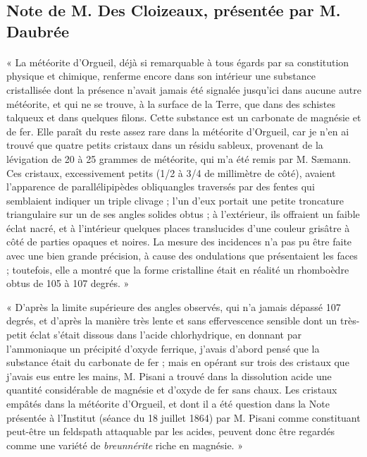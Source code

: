 \documentclass[a4paper, 11pt, oneside, polutonikogreek, french]{article}
\begin{document}
\subsection*{Note de M. Des Cloizeaux, présentée par M. Daubrée}
\paragraph{}
« La météorite d'Orgueil, déjà si remarquable à tous égards par sa constitution physique et chimique, renferme encore dans son intérieur une substance cristallisée dont la présence n'avait jamais été signalée jusqu'ici dans aucune autre météorite, et qui ne se trouve, à la surface de la Terre, que dans des schistes talqueux et dans quelques filons. Cette substance est un carbonate de magnésie et de fer. Elle paraît du reste assez rare dans la météorite d'Orgueil, car je n'en ai trouvé que quatre petits cristaux dans un résidu sableux, provenant de la lévigation de 20 à 25 grammes de météorite, qui m'a été remis par M. Sæmann. Ces cristaux, excessivement petits (1/2 à 3/4 de millimètre de côté), avaient l'apparence de parallélipipèdes obliquangles traversés par des fentes qui semblaient indiquer un triple clivage ; l'un d'eux portait une petite troncature triangulaire sur un de ses angles solides obtus ; à l'extérieur, ils offraient un faible éclat nacré, et à l'intérieur quelques places translucides d'une couleur grisâtre à côté de parties opaques et noires. La mesure des incidences n'a pas pu être faite avec une bien grande précision, à cause des ondulations que présentaient les faces ; toutefois, elle a montré que la forme cristalline était en réalité un rhomboèdre obtus de 105 à 107 degrés. »

« D'après la limite supérieure des angles observés, qui n'a jamais dépassé 107 degrés, et d'après la manière très lente et sans effervescence sensible dont un très-petit éclat s'était dissous dans l'acide chlorhydrique, en donnant par l'ammoniaque un précipité d'oxyde ferrique, j'avais d'abord pensé que la substance était du carbonate de fer ; mais en opérant sur trois des cristaux que j'avais eus entre les mains, M. Pisani a trouvé dans la dissolution acide une quantité considérable de magnésie et d'oxyde de fer sans chaux. Les cristaux empâtés dans la météorite d'Orgueil, et dont il a été question dans la Note présentée à l'Institut (séance du 18 juillet 1864) par M. Pisani comme constituant peut-être un feldspath attaquable par les acides, peuvent donc être regardés comme une variété de \emph{breunnérite} riche en magnésie. »
\end{document}
